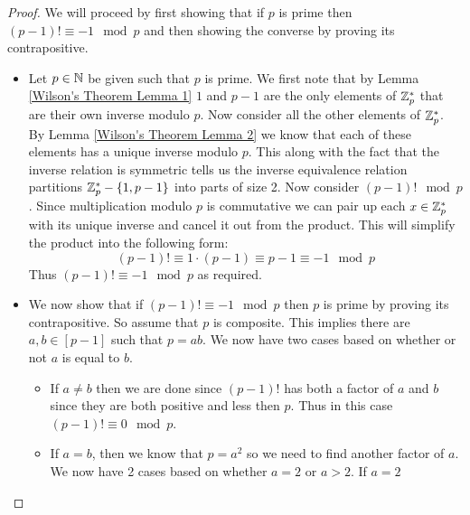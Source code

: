         \begin{proof}
            We will proceed by first showing that if $p$ is prime then $(p - 1)! \equiv -1 \mod p$ and then
            showing the converse by proving its contrapositive.

            \begin{itemize}
                \item
                    Let $p \in \mathbb{N}$ be given such that $p$ is prime. 
                    We first note that by Lemma \ref{Wilson's Theorem Lemma 1} $1$ and $p - 1$ are the
                    only elements of $\mathbb{Z}_{p}^{*}$ that are their own inverse modulo $p$. Now consider
                    all the other elements of $\mathbb{Z}_{p}^{*}$. By Lemma \ref{Wilson's Theorem Lemma 2} we know
                    that each of these elements has a unique inverse modulo $p$. This along with the fact
                    that the inverse relation is symmetric tells us the inverse equivalence relation
                    partitions $\mathbb{Z}_{p}^{*} - \left\{1, p - 1\right\}$ into parts of size 2. Now consider
                    $(p - 1)! \mod p$. Since multiplication modulo $p$ is commutative we can pair up each
                    $x \in \mathbb{Z}_{p}^{*}$ with its unique inverse and cancel it out from the product. This
                    will simplify the product into the following form:
                    \[
                        (p - 1)! \equiv 1 \cdot (p - 1) \equiv p - 1 \equiv -1 \mod p
                    \]
                    Thus $(p - 1)! \equiv -1 \mod p$ as required.
                \item
                    We now show that if $(p - 1)! \equiv -1 \mod p$ then $p$ is prime by proving
                    its contrapositive. So assume that $p$ is composite. This implies there are
                    $a, b \in [p - 1]$ such that $p = ab$. We now have two cases based on whether
                    or not $a$ is equal to $b$.
                    \begin{itemize}
                        \item
                            If $a \neq b$ then we are done since $(p - 1)!$ has both a factor of $a$
                            and $b$ since they are both positive and less then $p$. Thus in this case
                            $(p - 1)! \equiv 0 \mod p$.
                        \item 
                            If $a = b$, then we know that $p = a^2$ so we need to find another factor
                            of $a$. We now have 2 cases based on whether $a = 2$ or $a > 2$. If $a = 2$

\end{itemize}
\end{itemize}
\end{proof}
